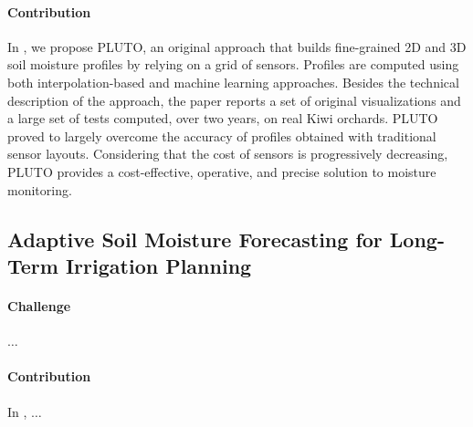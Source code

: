 \paragraph{Contribution} In , we propose PLUTO, an original approach that builds fine-grained 2D and 3D soil moisture profiles by relying on a grid of sensors.
Profiles are computed using both interpolation-based and machine learning approaches. Besides the technical description of the approach, the paper reports a set of original visualizations and a large set of tests computed, over two years, on real Kiwi orchards.
PLUTO proved to largely overcome the accuracy of profiles obtained with traditional sensor layouts.
Considering that the cost of sensors is progressively decreasing, PLUTO provides a cost-effective, operative, and precise solution to moisture monitoring.


\subsection*{Adaptive Soil Moisture Forecasting for Long-Term Irrigation Planning}


\paragraph{Challenge} $\dots$


\paragraph{Contribution} In , $\dots$



